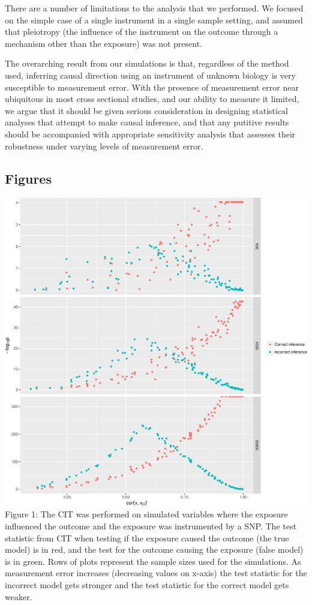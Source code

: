 \documentclass[]{article}
\begin{document}
There are a number of limitations to the analysis that we performed. We
focused on the simple case of a single instrument in a single sample
setting, and assumed that pleiotropy (the influence of the instrument on
the outcome through a mechanism other than the exposure) was not
present.

The overarching result from our simulations is that, regardless of the
method used, inferring causal direction using an instrument of unknown
biology is very susceptible to measurement error. With the presence of
measurement error near ubiquitous in most cross sectional studies, and
our ability to measure it limited, we argue that it should be given
serious consideration in designing statistical analyses that attempt to
make causal inference, and that any putitive results should be
accompanied with appropriate sensitivity analysis that assesses their
robustness under varying levels of measurement error.

\newpage

\subsection{Figures}\label{figures}

\includegraphics{manuscript_files/figure-latex/cit_measurement_error_figure-1.pdf}\\
Figure 1: The CIT was performed on simulated variables where the
exposure influenced the outcome and the exposure was instrumented by a
SNP. The test statistic from CIT when testing if the exposure caused the
outcome (the true model) is in red, and the test for the outcome causing
the exposure (false model) is in green. Rows of plots represent the
sample sizes used for the simulations. As measurement error increases
(decreasing values on x-axis) the test statistic for the incorrect model
gets stronger and the test statistic for the correct model gets weaker.
\end{document}
